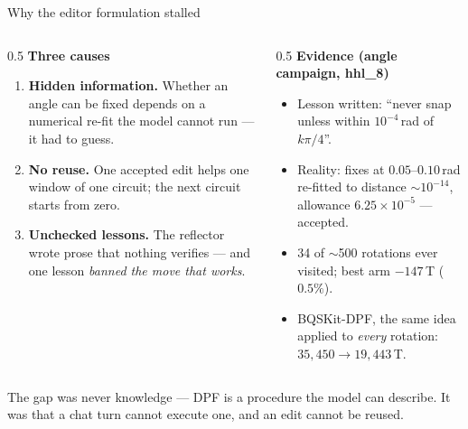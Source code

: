 \begin{frame}{Why the editor formulation stalled}

{\footnotesize
\begin{columns}[T]
\begin{column}{0.5\textwidth}
\textbf{Three causes}
\begin{enumerate}
  \item \textbf{Hidden information.} Whether an angle can be fixed depends on a numerical
        re-fit the model cannot run --- it had to guess.
  \item \textbf{No reuse.} One accepted edit helps one window of one circuit; the next circuit
        starts from zero.
  \item \textbf{Unchecked lessons.} The reflector wrote prose that nothing verifies ---
        and one lesson \emph{banned the move that works}.
\end{enumerate}
\end{column}
\begin{column}{0.5\textwidth}
\textbf{Evidence (angle campaign, hhl\_8)}
\begin{itemize}
  \item Lesson written: ``never snap unless within $10^{-4}$\,rad of $k\pi/4$''.
  \item Reality: fixes at $0.05$--$0.10$\,rad re-fitted to distance $\sim\!10^{-14}$,
        allowance $6.25\times10^{-5}$ --- accepted.
  \item 34 of $\sim$500 rotations ever visited; best arm $-147$\,T ($0.5\%$).
  \item BQSKit-DPF, the same idea applied to \emph{every} rotation: $35{,}450 \to 19{,}443$\,T.
\end{itemize}
\end{column}
\end{columns}}

\vspace{0.25cm}
{\footnotesize \alert{The gap was never knowledge --- DPF is a procedure the model can describe.
It was that a chat turn cannot execute one, and an edit cannot be reused.}}

\end{frame}
